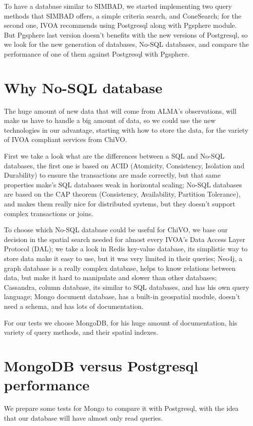 \documentclass[11pt,twoside]{article}
\begin{document}
To have a database similar to SIMBAD, we    started implementing two query methods that SIMBAD offers, a simple criteria search, and ConeSearch; for the second one, IVOA recommends using Postgresql along with Pgsphere module. But Pgsphere last version doesn't benefits with the new versions of Postgresql, so we look for the new generation of databases, No-SQL databases, and compare the performance of one of them against Postgresql with Pgsphere.


\section{Why No-SQL database}
    The huge amount of new data that will come from ALMA’s observations, will make us  have to handle a big amount of data, so we could use the new technologies in our advantage, starting with how to store the data, for the variety of IVOA compliant services from ChiVO.
    
    First we take a look what are the differences between a SQL and No-SQL databases, the first one is based on ACID (Atomicity, Consistency, Isolation and Durability) to ensure the transactions are made correctly, but that same properties make’s SQL databases weak in horizontal scaling; No-SQL databases are based on the CAP theorem (Consistency, Availability, Partition Tolerance), and makes them really nice for distributed systems, but they doesn't support complex transactions or joins.

    To choose which No-SQL database could be useful for ChiVO, we base our decision in the spatial search needed for almost every IVOA’s Data Access Layer Protocol (DAL); we take a look in Redis key-value database, its simplistic way to store data make it easy to use, but it was very limited in their queries; Neo4j, a graph database is a really complex database, helps to know relations between data, but make it hard to manipulate and slower than other databases; Cassandra, column database, its similar to SQL databases, and has his own query language; Mongo document database, has a built-in geospatial module, doesn’t need a schema, and has lots of documentation.

    For our tests we choose MongoDB, for his huge amount of documentation, his variety of query methods, and their spatial indexes.


\section{MongoDB versus Postgresql performance}
    We prepare some tests for Mongo to compare it with Postgresql, with the idea that our database will have almost only read queries.
    
\end{document}
